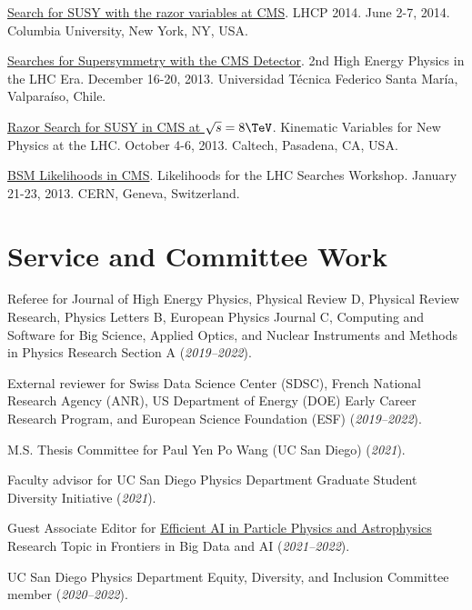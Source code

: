 \documentclass[11pt]{res}
\newif\ifext
\newenvironment{extended}{\ifext}{\fi}
\newcommand{\MarginText}[1]{\section{#1}\vspace{10pt}}
\begin{document}
\begin{resume}
\begin{extended}
    \href{https://indico.cern.ch/event/279518/contributions/634785/}{Search for SUSY with the razor variables at CMS}. LHCP 2014. June 2-7, 2014. Columbia University, New York, NY, USA.

    \href{https://indico.cern.ch/event/252857/contributions/1579321/}{Searches for Supersymmetry with the CMS Detector}. 2nd High Energy Physics in the LHC Era. December 16-20, 2013. Universidad T\'{e}cnica Federico Santa Mar\'{i}a, Valpara\'{i}so, Chile.

    \href{https://indico.cern.ch/event/261650/contributions/586374/}{Razor Search for SUSY in CMS at $\sqrt{s}=8\TeV$}. Kinematic Variables for New Physics at the LHC. October 4-6, 2013. Caltech, Pasadena, CA, USA.

    \href{https://indico.cern.ch/event/218693/contributions/1520333/}{BSM Likelihoods in CMS}. Likelihoods for the LHC Searches Workshop. January 21-23, 2013. CERN, Geneva, Switzerland.

  \end{extended}


  \MarginText{Service and Committee Work}

  Referee for Journal of High Energy Physics, Physical Review D, Physical Review Research, Physics Letters B, European Physics Journal C, Computing and Software for Big Science, Applied Optics, and Nuclear Instruments and Methods in Physics Research Section A (\textit{2019--2022}).

  External reviewer for Swiss Data Science Center (SDSC), French National Research Agency (ANR), US Department of Energy (DOE) Early Career Research Program, and European Science Foundation (ESF) (\textit{2019--2022}).

  M.S. Thesis Committee for Paul Yen Po Wang (UC San Diego) (\textit{2021}).

  Faculty advisor for UC San Diego Physics Department Graduate Student Diversity Initiative (\textit{2021}).

  Guest Associate Editor for \href{https://www.frontiersin.org/research-topics/19095/efficient-ai-in-particle-physics-and-astrophysics}{Efficient AI in Particle Physics and Astrophysics} Research Topic in Frontiers in Big Data and AI (\textit{2021--2022}).

  UC San Diego Physics Department Equity, Diversity, and Inclusion Committee member (\textit{2020--2022}).


\end{resume}
\end{document}
